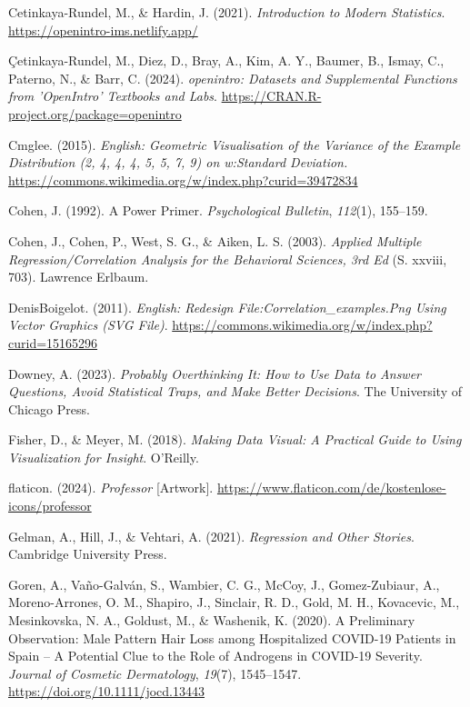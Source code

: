 \documentclass[
  letterpaper,
  oneside,
  open=any]{scrbook}
\newlength{\cslhangindent}
\newenvironment{CSLReferences}[2] %
 {\begin{list}{}{%
  \setlength{\itemindent}{0pt}
  \setlength{\leftmargin}{0pt}
  \setlength{\parsep}{0pt}
  \ifodd #1
   \setlength{\leftmargin}{\cslhangindent}
   \setlength{\itemindent}{-1\cslhangindent}
  \fi
  \setlength{\itemsep}{#2\baselineskip}}}
 {\end{list}}
\theoremstyle{definition}
\theoremstyle{definition}
\theoremstyle{definition}
\theoremstyle{remark}
\begin{document}
\begin{CSLReferences}{1}{0}
Cetinkaya-Rundel, M., \& Hardin, J. (2021). \emph{Introduction to
{Modern Statistics}}. \url{https://openintro-ims.netlify.app/}

Çetinkaya-Rundel, M., Diez, D., Bray, A., Kim, A. Y., Baumer, B., Ismay,
C., Paterno, N., \& Barr, C. (2024). \emph{openintro: Datasets and
Supplemental Functions from 'OpenIntro' Textbooks and Labs}.
\url{https://CRAN.R-project.org/package=openintro}

Cmglee. (2015). \emph{English: {Geometric} Visualisation of the Variance
of the Example Distribution (2, 4, 4, 4, 5, 5, 7, 9) on w:{Standard}
Deviation.}
\url{https://commons.wikimedia.org/w/index.php?curid=39472834}

Cohen, J. (1992). A Power Primer. \emph{Psychological Bulletin},
\emph{112}(1), 155--159.

Cohen, J., Cohen, P., West, S. G., \& Aiken, L. S. (2003). \emph{Applied
Multiple Regression/Correlation Analysis for the Behavioral Sciences,
3rd Ed} (S. xxviii, 703). Lawrence Erlbaum.

DenisBoigelot. (2011). \emph{English: Redesign
{File}:{Correlation}\_examples.Png Using Vector Graphics ({SVG} File)}.
\url{https://commons.wikimedia.org/w/index.php?curid=15165296}

Downey, A. (2023). \emph{Probably Overthinking It: How to Use Data to
Answer Questions, Avoid Statistical Traps, and Make Better Decisions}.
The University of Chicago Press.

Fisher, D., \& Meyer, M. (2018). \emph{Making Data Visual: A Practical
Guide to Using Visualization for Insight}. O'Reilly.

flaticon. (2024). \emph{Professor} {[}Artwork{]}.
\url{https://www.flaticon.com/de/kostenlose-icons/professor}

Gelman, A., Hill, J., \& Vehtari, A. (2021). \emph{Regression and Other
Stories}. Cambridge University Press.

Goren, A., Vaño-Galván, S., Wambier, C. G., McCoy, J., Gomez-Zubiaur,
A., Moreno-Arrones, O. M., Shapiro, J., Sinclair, R. D., Gold, M. H.,
Kovacevic, M., Mesinkovska, N. A., Goldust, M., \& Washenik, K. (2020).
A Preliminary Observation: {Male} Pattern Hair Loss among Hospitalized
{COVID-19} Patients in {Spain} -- {A} Potential Clue to the Role of
Androgens in {COVID-19} Severity. \emph{Journal of Cosmetic
Dermatology}, \emph{19}(7), 1545--1547.
\url{https://doi.org/10.1111/jocd.13443}


\end{CSLReferences}
\end{document}
